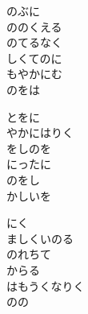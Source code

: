 \documentclass[10pt,b5j]{tarticle} %
\begin{document}
\vspace{1.5em} %
\newcommand{\linespace}{0.5em} %
\newcommand{\blocksize}{0.5\hsize} %
\begin{enumerate} %
    \begin{minipage}[c]{\blocksize}
    
        \vspace{\linespace}
        \item
        のぶに\\
        ののくえる\\
        のてるなく\\
        しくてのに\\
        もやかにむ\\
        のをは
        
        \vspace{\linespace}
        \item
        とをに\\
        やかにはりく\\
        をしのを\\
        にったに\\
        のをし\\
        かしいを
        
        \vspace{\linespace}
        \item
        にく\\
        ましくいのる\\
        のれちて\\
        からる\\
        はもうくなりく\\
        のの
        

\end{minipage}
\end{enumerate}
\end{document}
